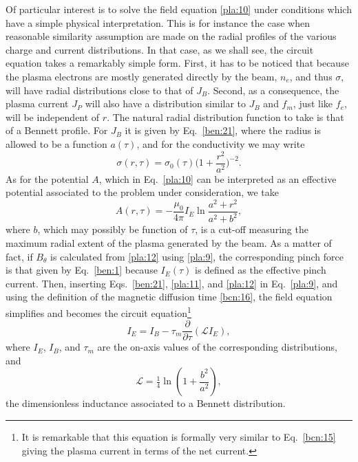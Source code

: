 \documentclass [12pt,a4paper,     ]{report} %
\begin{document}
    Of particular interest is to solve the field equation \eqref{pla:10} under conditions which have a simple physical interpretation.   This is for instance the case when reasonable similarity assumption are made on the radial profiles of the various charge and current distributions.  In that case, as we shall see, the circuit equation takes a remarkably simple form.  First, it has to be noticed that because the plasma electrons are mostly generated directly by the beam, $n_e$, and thus $\sigma$, will have radial distributions close to that of $J_B$.  Second, as a consequence, the plasma current $J_P$ will also have a distribution similar to $J_B$ \cite{KINGS1973-} and $f_m$, just like $f_e$, will be independent of $r$.  The natural radial distribution function to take is that of a Bennett profile.  For $J_B$ it is given by Eq.~\eqref{ben:21}, where the radius is allowed to be a function $a(\tau)$, and for the conductivity we may write
%
\begin{equation}\label{pla:11} %
     \sigma(r,\tau) = \sigma_0(\tau) \bigr(1 + \frac{r^2}{a^2}\bigl)^{-2}.
\end{equation}
%
As for the potential $A$, which in Eq.~\eqref{pla:10} can be interpreted as an effective potential associated to the problem under consideration, we take \cite[p.66]{LEE--1976B}
%
\begin{equation}\label{pla:12} %
     A(r,\tau) = -\frac{\mu_0}{4\pi} I_E \ln \frac{a^2 + r^2}{a^2 + b^2},
\end{equation}
%
where $b$, which may possibly be function of $\tau$, is a cut-off measuring the maximum radial extent of the plasma generated by the beam.  As a matter of fact, if $B_\theta$ is calculated from \eqref{pla:12} using \eqref{pla:9}, the corresponding pinch force is that given by Eq.~\eqref{ben:1} because $I_E(\tau)$ is defined as the effective pinch current.  Then, inserting Eqs.~\eqref{ben:21}, \eqref{pla:11}, and \eqref{pla:12} in Eq.~\eqref{pla:9}, and using the definition of the magnetic diffusion time \eqref{bcn:16}, the field equation simplifies and becomes the circuit equation\footnote{It is remarkable that this equation is formally very similar to Eq.~\eqref{bcn:15} giving the plasma current in terms of the net current.} 
%
\begin{equation}\label{pla:13} %
    I_E = I_B  - \tau_m        \frac{\partial}{\partial\tau}(\mathcal{L}I_E),
\end{equation}
%
where $I_E$, $I_B$, and $\tau_m$ are the on-axis values of the corresponding distributions, and
%
\begin{equation}\label{pla:14} %
    \mathcal{L} = \tfrac{1}{4} \ln(1+\frac{b^2}{a^2}),
\end{equation}
%
the dimensionless inductance associated to a Bennett distribution.
\end{document}
